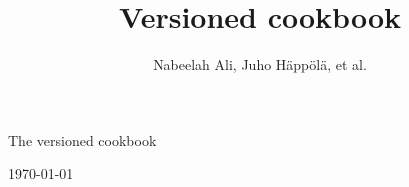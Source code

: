 



\newcommand{\sthnolla}[0]{}

\title{Versioned cookbook}
\author{Nabeelah Ali, Juho H\"{a}pp\"{o}l\"{a}, et al.}



\begin{center}

\vspace{7 cm}
\huge
The versioned cookbook


\large
\vspace{1 cm}
\today{}

\vspace{5 cm}

\end{center}

\thispagestyle{empty}

\normalsize

\newpage 

\tableofcontents






